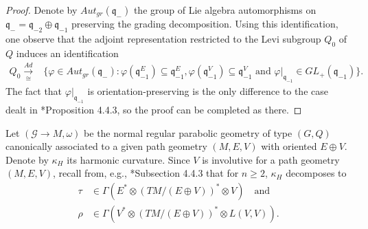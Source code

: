 \documentclass[11pt]{amsart}
\newtheorem{lemma}[proposition]{Lemma}
\begin{document}
\begin{proof}
Denote by $Aut_{gr}(\mathfrak q_-)$ the group of Lie algebra automorphisms on $\mathfrak q_-=\mathfrak q_{-2}\oplus\mathfrak q_{-1}$ preserving the grading decomposition. Using this identification, one observe that the adjoint representation restricted to the Levi subgroup $Q_0$ of $Q$ induces an identification
\begin{align*}
    Q_0\xrightarrow[\cong]{Ad}&\{\varphi\in Aut_{gr}(\mathfrak q_-):\varphi(\mathfrak q_{-1}^E)\subseteq\mathfrak q_{-1}^E,\varphi(\mathfrak q_{-1}^V)\subseteq\mathfrak q_{-1}^V\text{ and }\varphi|_{\mathfrak q_{-1}}\in GL_+(\mathfrak q_{-1})\}.
\end{align*}
The fact that $\varphi|_{\mathfrak q_{-1}}$ is orientation-preserving is the only difference to the case dealt in \cite{Book}*{Proposition 4.4.3}, so the proof can be completed as there.
\end{proof}

Let $(\mathcal G\to M,\omega)$ be the normal regular parabolic geometry of type $(G,Q)$ canonically associated to a given path geometry $(M,E,V)$ with oriented $E\oplus V$. Denote by $\kappa_H$ its harmonic curvature. Since $V$ is involutive for a path geometry $(M,E,V)$, recall from, e.g., \cite{Book}*{Subsection 4.4.3} that for $n\geq 2$, $\kappa_H$ decomposes to
\begin{equation}\label{harmonic components path}\begin{aligned}
    \tau&\in\Gamma(E^*\otimes(TM/(E\oplus V))^*\otimes V)\quad\text{and}\\
    \rho&\in\Gamma(V^*\otimes(TM/(E\oplus V))^*\otimes L(V,V)).
\end{aligned}
\end{equation}
\end{document}
